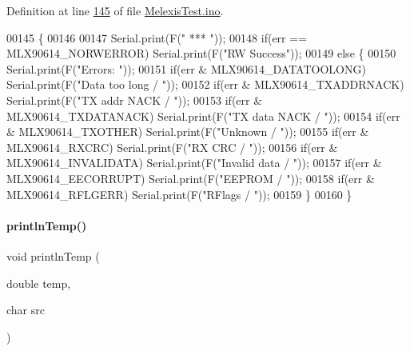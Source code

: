Definition at line \mbox{\hyperlink{_melexis_test_8ino_source_l00145}{145}} of file \mbox{\hyperlink{_melexis_test_8ino_source}{Melexis\+Test.\+ino}}.


\begin{DoxyCode}
00145                               \{
00146 
00147     Serial.print(F(\textcolor{stringliteral}{"  *** "}));
00148     \textcolor{keywordflow}{if}(err == MLX90614\_NORWERROR) Serial.print(F(\textcolor{stringliteral}{"RW Success"}));
00149     \textcolor{keywordflow}{else} \{
00150         Serial.print(F(\textcolor{stringliteral}{"Errors: "}));
00151         \textcolor{keywordflow}{if}(err &  MLX90614\_DATATOOLONG) Serial.print(F(\textcolor{stringliteral}{"Data too long / "}));
00152         \textcolor{keywordflow}{if}(err &  MLX90614\_TXADDRNACK)  Serial.print(F(\textcolor{stringliteral}{"TX addr NACK / "}));
00153         \textcolor{keywordflow}{if}(err &  MLX90614\_TXDATANACK)  Serial.print(F(\textcolor{stringliteral}{"TX data NACK / "}));
00154         \textcolor{keywordflow}{if}(err &  MLX90614\_TXOTHER)     Serial.print(F(\textcolor{stringliteral}{"Unknown / "}));
00155         \textcolor{keywordflow}{if}(err &  MLX90614\_RXCRC)       Serial.print(F(\textcolor{stringliteral}{"RX CRC / "}));
00156         \textcolor{keywordflow}{if}(err &  MLX90614\_INVALIDATA)  Serial.print(F(\textcolor{stringliteral}{"Invalid data / "}));
00157         \textcolor{keywordflow}{if}(err &  MLX90614\_EECORRUPT)   Serial.print(F(\textcolor{stringliteral}{"EEPROM / "}));
00158         \textcolor{keywordflow}{if}(err &  MLX90614\_RFLGERR)     Serial.print(F(\textcolor{stringliteral}{"RFlags / "}));
00159     \}
00160 \}
\end{DoxyCode}
\mbox{\label{_melexis_test_8ino_a3906dd03c261bb9c83de87b9988e91ce}} 
\paragraph{\texorpdfstring{println\+Temp()}{printlnTemp()}}
{\footnotesize\ttfamily void println\+Temp (\begin{DoxyParamCaption}\item[{double}]{temp,  }\item[{char}]{src }\end{DoxyParamCaption})}



